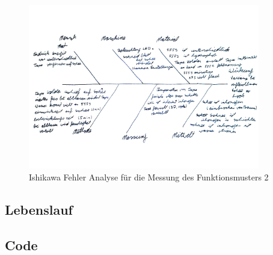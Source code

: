 \documentclass[a4paper,12pt]{article}
\begin{document}
%
\begin{figure}
    \centering
    \includegraphics[width=0.9\textwidth]{Bilder/IshikawaDavos.jpg}
    \caption{Ishikawa Fehler Analyse für die Messung des Funktionsmusters 2}
    \label{fig:IshikwaDavos}
\end{figure}

\subsection*{Lebenslauf}


\subsection*{Code}

\end{document}

